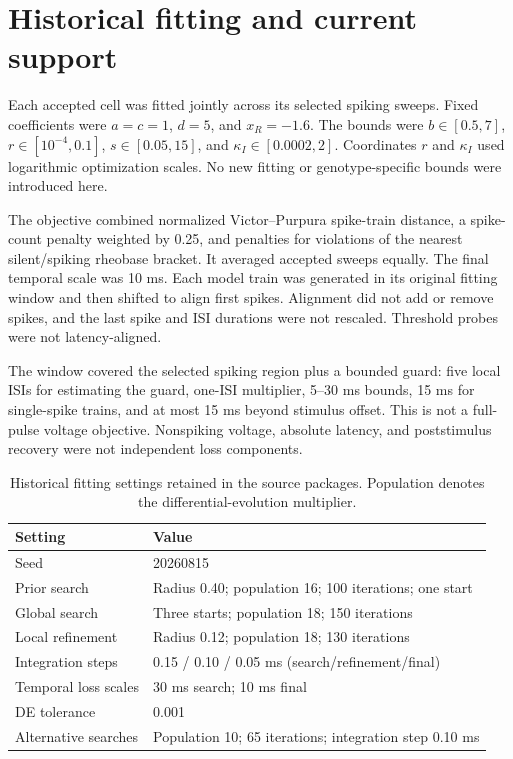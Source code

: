 \documentclass[11pt,a4paper]{article}
\begin{document}
\section{Historical fitting and current support}\label{s:fit}
Each accepted cell was fitted jointly across its selected spiking sweeps. Fixed coefficients were $a=c=1$, $d=5$, and $x_R=-1.6$. The bounds were $b\in[0.5,7]$, $r\in[10^{-4},0.1]$, $s\in[0.05,15]$, and $\kappa_I\in[0.0002,2]$. Coordinates $r$ and $\kappa_I$ used logarithmic optimization scales. No new fitting or genotype-specific bounds were introduced here.

The objective combined normalized Victor--Purpura spike-train distance, a spike-count penalty weighted by 0.25, and penalties for violations of the nearest silent/spiking rheobase bracket. It averaged accepted sweeps equally. The final temporal scale was 10 ms. Each model train was generated in its original fitting window and then shifted to align first spikes. Alignment did not add or remove spikes, and the last spike and ISI durations were not rescaled. Threshold probes were not latency-aligned.

The window covered the selected spiking region plus a bounded guard: five local ISIs for estimating the guard, one-ISI multiplier, 5--30 ms bounds, 15 ms for single-spike trains, and at most 15 ms beyond stimulus offset. This is not a full-pulse voltage objective. Nonspiking voltage, absolute latency, and poststimulus recovery were not independent loss components.

\begin{table}[htbp]\centering\small
\caption{Historical fitting settings retained in the source packages. Population denotes the differential-evolution multiplier.}
\begin{tabularx}{\textwidth}{@{}lX@{}}\toprule Setting&Value\\\midrule
Seed&20260815\\Prior search&Radius 0.40; population 16; 100 iterations; one start\\Global search&Three starts; population 18; 150 iterations\\Local refinement&Radius 0.12; population 18; 130 iterations\\Integration steps&0.15 / 0.10 / 0.05 ms (search/refinement/final)\\Temporal loss scales&30 ms search; 10 ms final\\DE tolerance&0.001\\Alternative searches&Population 10; 65 iterations; integration step 0.10 ms\\\bottomrule\end{tabularx}\end{table}
\end{document}
